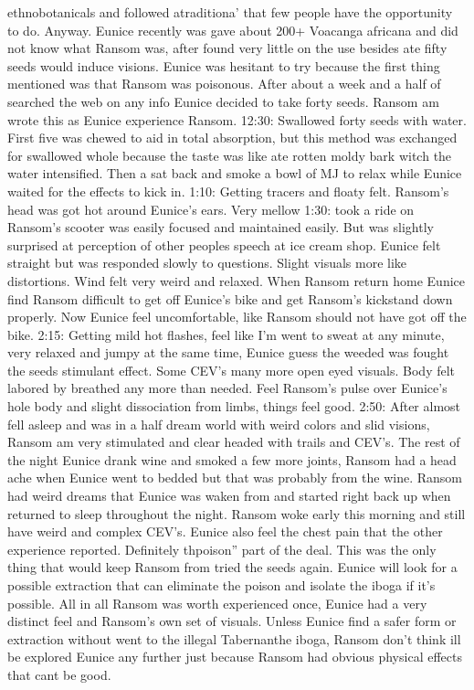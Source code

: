 \documentclass[12pt]{book}
\begin{document}
ethnobotanicals and followed atraditiona' that few people have the opportunity to do. Anyway. Eunice recently was gave about 200+ Voacanga africana and did not know what Ransom was, after found very little on the use besides ate fifty seeds would induce visions. Eunice was hesitant to try because the first thing mentioned was that Ransom was poisonous. After about a week and a half of searched the web on any info Eunice decided to take forty seeds. Ransom am wrote this as Eunice experience Ransom. 12:30: Swallowed forty seeds with water. First five was chewed to aid in total absorption, but this method was exchanged for swallowed whole because the taste was like ate rotten moldy bark witch the water intensified. Then a sat back and smoke a bowl of MJ to relax while Eunice waited for the effects to kick in. 1:10: Getting tracers and floaty felt. Ransom's head was got hot around Eunice's ears. Very mellow 1:30: took a ride on Ransom's scooter was easily focused and maintained easily. But was slightly surprised at perception of other peoples speech at ice cream shop. Eunice felt straight but was responded slowly to questions. Slight visuals more like distortions. Wind felt very weird and relaxed. When Ransom return home Eunice find Ransom difficult to get off Eunice's bike and get Ransom's kickstand down properly. Now Eunice feel uncomfortable, like Ransom should not have got off the bike. 2:15: Getting mild hot flashes, feel like I'm went to sweat at any minute, very relaxed and jumpy at the same time, Eunice guess the weeded was fought the seeds stimulant effect. Some CEV's many more open eyed visuals. Body felt labored by breathed any more than needed. Feel Ransom's pulse over Eunice's hole body and slight dissociation from limbs, things feel good. 2:50: After almost fell asleep and was in a half dream world with weird colors and slid visions, Ransom am very stimulated and clear headed with trails and CEV's. The rest of the night Eunice drank wine and smoked a few more joints, Ransom had a head ache when Eunice went to bedded but that was probably from the wine. Ransom had weird dreams that Eunice was waken from and started right back up when returned to sleep throughout the night. Ransom woke early this morning and still have weird and complex CEV's. Eunice also feel the chest pain that the other experience reported. Definitely thpoison'' part of the deal. This was the only thing that would keep Ransom from tried the seeds again. Eunice will look for a possible extraction that can eliminate the poison and isolate the iboga if it's possible. All in all Ransom was worth experienced once, Eunice had a very distinct feel and Ransom's own set of visuals. Unless Eunice find a safer form or extraction without went to the illegal Tabernanthe iboga, Ransom don't think ill be explored Eunice any further just because Ransom had obvious physical effects that cant be good.
\end{document}
